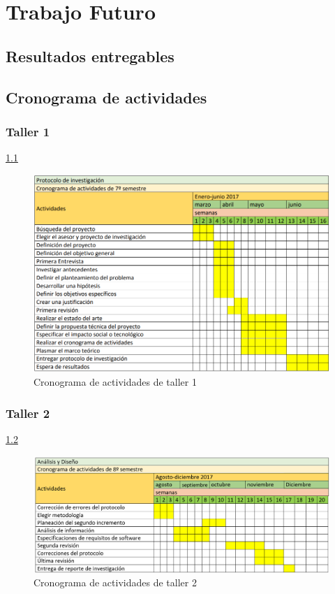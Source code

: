  \chapter{Trabajo Futuro}

 \section{Resultados entregables}


\section{Cronograma de actividades}
    \subsection{Taller 1}\ref{Taller1}
    \begin{figure}[h]

      \centering
      \includegraphics[scale=.7]{lib/assets/cronograma-1}
      \caption{Cronograma de actividades de taller 1}
      \label{Taller1}
    \end{figure}

    \subsection{Taller 2}\ref{Taller2}

    \begin{figure}[h]
      \centering
      \includegraphics[scale=.7]{lib/assets/cronogramataller2}
      \caption{Cronograma de actividades de taller 2}
      \label{Taller2}
    \end{figure}


